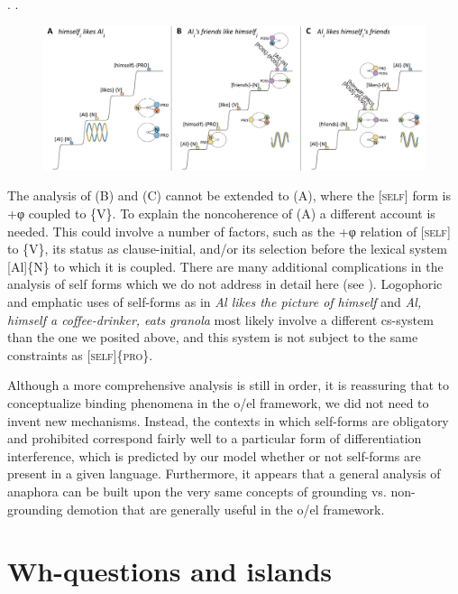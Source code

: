 \ea
{}.
.
\z
\z

\begin{figure}
\includegraphics[width=\textwidth]{figures/Tilsen-img157.png}
\caption{\missingcaption}
\label{fig:}
\end{figure}
 

  The analysis of (B) and (C) cannot be extended to (A), where the [\textsc{self}] form is +φ coupled to \{V\}. To explain the noncoherence of (A) a different account is needed. This could involve a number of factors, such as the +φ relation of [\textsc{self}] to \{V\}, its status as clause-initial, and/or its selection before the lexical system [Al]\{N\} to which it is coupled. There are many additional complications in the analysis of self forms which we do not address in detail here (see \citealt{KönigSiemund2000,Safir2004}). Logophoric and emphatic uses of self-forms as in \textit{Al likes the picture of himself} and \textit{Al, himself a coffee-drinker, eats granola} most likely involve a different cs-system than the one we posited above, and this system is not subject to the same constraints as [\textsc{self}]\{\textsc{pro}\}. 

  Although a more comprehensive analysis is still in order, it is reassuring that to conceptualize binding phenomena in the o/el framework, we did not need to invent new mechanisms. Instead, the contexts in which self-forms are obligatory and prohibited correspond fairly well to a particular form of differentiation interference, which is predicted by our model whether or not self-forms are present in a given language. Furthermore, it appears that a general analysis of anaphora can be built upon the very same concepts of grounding vs. non-grounding demotion that are generally useful in the o/el framework.

\section{Wh-questions and islands}

